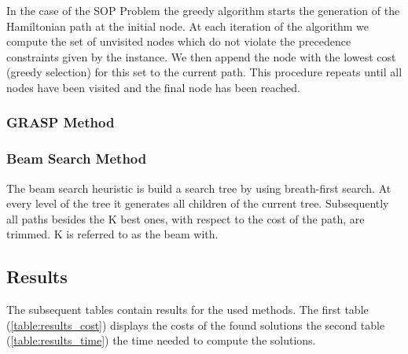 \documentclass[]{article}
\begin{document}
   	In the case of the SOP Problem the greedy algorithm starts the generation of the Hamiltonian path at the initial node. At each iteration of the algorithm we compute the set of unvisited nodes which do not violate the precedence constraints given by the instance. We then append the node with the lowest cost (greedy selection) for this set to the current path. This procedure repeats until all nodes have been visited and the final node has been reached.

    \subsubsection{GRASP Method}


    \subsubsection{Beam Search Method}

    The beam search heuristic is build a search tree by using breath-first search. At every level of the tree it generates all children of the current tree. Subsequently all paths besides the K best ones, with respect to the cost of the path, are trimmed. K is referred to as the beam with. 

    \cite{Beam:1} \cite{Beam:2} 


    \subsection{Results}
    \label{results}

    The subsequent tables contain results for the used methods. The first table (\ref{table:results_cost}) displays the costs of the found solutions the second table (\ref{table:results_time}) the time needed to compute the solutions. 
\end{document}
